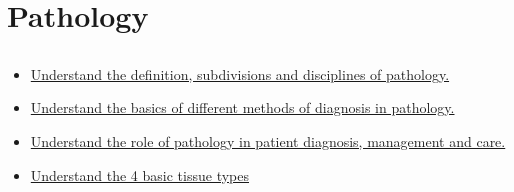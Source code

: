 \documentclass[10pt, a4paper]{article}
\begin{document}
\section{Pathology}
\subsection{} \begin{itemize} \item \href{https://www.notion.so/dbfe3bf76d0f4a988b6d6625d5c5b454}{Understand the definition, subdivisions and disciplines of pathology.} \item \href{https://www.notion.so/fd49d59fa4d14509b8192a2ae4955478}{Understand the basics of different methods of diagnosis in pathology.} \item \href{https://www.notion.so/588064dafd9d4b6b9c795495a9b113d2}{Understand the role of pathology in patient diagnosis, management and care.} \item \href{https://www.notion.so/a60c15863b704d91a4d38cebca253b86}{Understand the 4 basic tissue types} \end{itemize}
\end{document}
